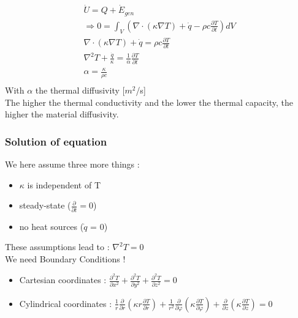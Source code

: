\documentclass[../main.tex]{subfiles}
\begin{document}
\begin{equation}
    \begin{gathered}
        \dot{U} = Q + \dot{E}_{gen}\\
        \Rightarrow 0 = \int_V (\nabla \cdot (\kappa \nabla T) + \dot{q} - \rho c \frac{\partial T}{\partial t})dV\\
        \nabla \cdot (\kappa \nabla T) + \dot{q} = \rho c \frac{\partial T}{\partial t}\\
        \nabla^2 T + \frac{\dot{q}}{\kappa} = \frac{1}{\alpha} \frac{\partial T}{\partial t}\\
        \alpha = \frac{\kappa}{\rho c}\\
    \end{gathered}
\end{equation}
With $\alpha$ the thermal diffusivity [$m^2$/s]\\

The higher the thermal conductivity and the lower the thermal capacity, the higher the material diffusivity.\\

\subsubsection{Solution of equation}
We here assume three more things : \begin{itemize}
    \item $\kappa$ is independent of T\\
    \item steady-state ($\frac{\partial}{\partial t}=0$)\\
    \item no heat sources ($\dot{q}$ = 0)\\
\end{itemize}

These assumptions lead to : $\nabla^2 T = 0$\\
\warning We need Boundary Conditions !\\

\begin{itemize}
    \item Cartesian coordinates : $\frac{\partial^2 T}{\partial x^2} + \frac{\partial^2 T}{\partial y^2} + \frac{\partial^2 T}{\partial z^2} = 0$\\
    \item Cylindrical coordinates : $\frac{1}{r} \frac{\partial}{\partial r}(\kappa r \frac{\partial T}{\partial r}) + \frac{1}{r^2} \frac{\partial}{\partial \varphi} (\kappa \frac{\partial T}{\partial \varphi}) + \frac{\partial}{\partial z}(\kappa \frac{\partial T}{\partial z}) = 0$\\
\end{itemize}
\end{document}

